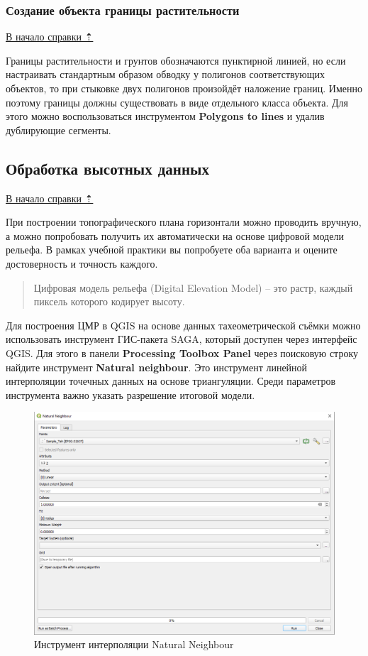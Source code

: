 \documentclass[
  12pt,
]{book}
\begin{document}
\subsubsection{Создание объекта границы растительности}\label{practice-topo-tips_tricks-vegetation-borders}

\hyperref[practice-topo]{В начало справки ⇡}

Границы растительности и грунтов обозначаются пунктирной линией, но если настраивать стандартным образом обводку у полигонов соответствующих объектов, то при стыковке двух полигонов произойдёт наложение границ. Именно поэтому границы должны существовать в виде отдельного класса объекта. Для этого можно воспользоваться инструментом \textbf{Polygons to lines} и удалив дублирующие сегменты.

\subsection{Обработка высотных данных}\label{practice-topo-elevation}

\hyperref[practice-topo]{В начало справки ⇡}

При построении топографического плана горизонтали можно проводить вручную, а можно попробовать получить их автоматически на основе цифровой модели рельефа. В рамках учебной практики вы попробуете оба варианта и оцените достоверность и точность каждого.

\begin{quote}
Цифровая модель рельефа (Digital Elevation Model) -- это растр, каждый пиксель которого кодирует высоту.
\end{quote}

Для построения ЦМР в QGIS на основе данных тахеометрической съёмки можно использовать инструмент ГИС-пакета SAGA, который доступен через интерфейс QGIS. Для этого в панели \textbf{Processing Toolbox Panel} через поисковую строку найдите инструмент \textbf{Natural neighbour}. Это инструмент линейной интерполяции точечных данных на основе триангуляции. Среди параметров инструмента важно указать разрешение итоговой модели.

\begin{figure}
\centering
\includegraphics{images/Practice/Natural_Neighbour.png}
\caption{Инструмент интерполяции Natural Neighbour}
\end{figure}
\end{document}
